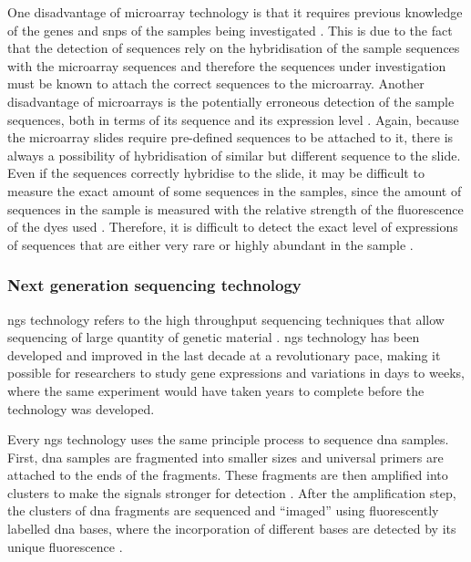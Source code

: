 One disadvantage of microarray technology is that it requires previous knowledge of the genes and \glspl{snp} of the samples being investigated \citep{Hurd2009}.
This is due to the fact that the detection of sequences rely on the hybridisation of the sample sequences with the microarray sequences and therefore the sequences under investigation must be known to attach the correct sequences to the microarray.
Another disadvantage of microarrays is the potentially erroneous detection of the sample sequences, both in terms of its sequence and its expression level \citep{Hurd2009}.
Again, because the microarray slides require pre-defined sequences to be attached to it, there is always a possibility of hybridisation of similar but different sequence to the slide.
Even if the sequences correctly hybridise to the slide, it may be difficult to measure the exact amount of some sequences in the samples, since the amount of sequences in the sample is measured with the relative strength of the fluorescence of the dyes used \citep{Hurd2009}.
Therefore, it is difficult to detect the exact level of expressions of sequences that are either very rare or highly abundant in the sample \citep{Hurd2009}.

\subsubsection{Next generation sequencing technology}
\label{ssub:next_generation_sequencing_technology}

\Gls{ngs} technology refers to the high throughput sequencing techniques that allow sequencing of large quantity of genetic material \citep{Metzker2010}.
\gls{ngs} technology has been developed and improved in the last decade at a revolutionary pace, making it possible for researchers to study gene expressions and variations in days to weeks, where the same experiment would have taken years to complete before the technology was developed.

Every \gls{ngs} technology uses the same principle process to sequence \acrshort{dna} samples.
First, \acrshort{dna} samples are fragmented into smaller sizes and universal primers are attached to the ends of the fragments.
These fragments are then amplified into clusters to make the signals stronger for detection \citep{Metzker2010}.
After the amplification step, the clusters of \acrshort{dna} fragments are sequenced and ``imaged'' using fluorescently labelled \acrshort{dna} bases, where the incorporation of different bases are detected by its unique fluorescence \citep{Metzker2010}.

